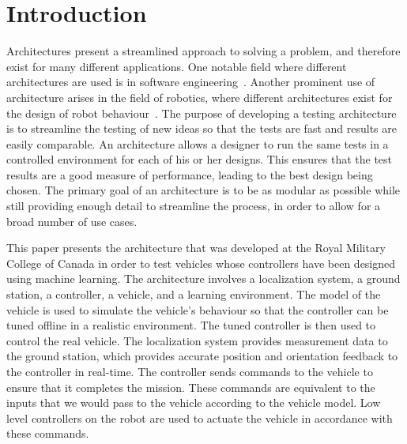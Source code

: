 \documentclass[conference]{IEEEtran}
\begin{document}



%

\section{Introduction}
\label{cha:intro}

Architectures present a streamlined approach to solving a problem, and therefore exist for many different applications. One notable field where different architectures are used is in software engineering~\cite{8216936}. Another prominent use of architecture arises in the field of robotics, where different architectures exist for the design of robot behaviour~\cite{Murphy:2000}. The purpose of developing a testing architecture is to streamline the testing of new ideas so that the tests are fast and results are easily comparable. An architecture allows a designer to run the same tests in a controlled environment for each of his or her designs. This ensures that the test results are a good measure of performance, leading to the best design being chosen. The primary goal of an architecture is to be as modular as possible while still providing enough detail to streamline the process, in order to allow for a broad number of use cases.

This paper presents the architecture that was developed at the Royal Military College of Canada in order to test vehicles whose controllers have been designed using machine learning. The architecture involves a localization system, a ground station, a controller, a vehicle, and a learning environment. The model of the vehicle is used to simulate the vehicle's behaviour so that the controller can be tuned offline in a realistic environment. The tuned controller is then used to control the real vehicle. The localization system provides measurement data to the ground station, which provides accurate position and orientation feedback to the controller in real-time. The controller sends commands to the vehicle to ensure that it completes the mission. These commands are equivalent to the inputs that we would pass to the vehicle according to the vehicle model. Low level controllers on the robot are used to actuate the vehicle in accordance with these commands. 
\end{document}
